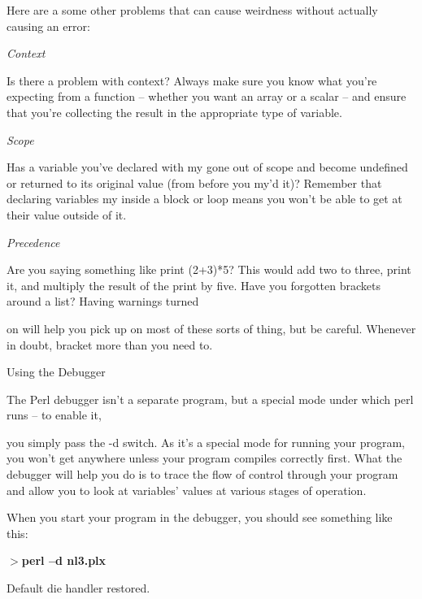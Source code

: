 \documentclass[a4paper,11pt]{book}
\begin{document}
\noindent 

\noindent Here are a some other problems that can cause weirdness without actually causing an error:

\noindent 

\noindent \textit{Context}

\noindent Is there a problem with context? Always make sure you know what you're expecting from a function -- whether you want an array or a scalar -- and ensure that you're collecting the result in the appropriate type of variable.

\noindent 

\noindent \textit{Scope}

\noindent Has a variable you've declared with my gone out of scope and become undefined or returned to its original value (from before you my'd it)? Remember that declaring variables my inside a block or loop means you won't be able to get at their value outside of it.

\noindent 

\noindent \textit{Precedence}

\noindent Are you saying something like print (2+3)*5? This would add two to three, print it, and multiply the result of the print by five. Have you forgotten brackets around a list? Having warnings turned

\noindent on will help you pick up on most of these sorts of thing, but be careful. Whenever in doubt, bracket more than you need to.

\noindent 

\noindent Using the Debugger

\noindent The Perl debugger isn't a separate program, but a special mode under which perl runs -- to enable it,

\noindent you simply pass the -d switch. As it's a special mode for running your program, you won't get anywhere unless your program compiles correctly first. What the debugger will help you do is to trace the flow of control through your program and allow you to look at variables' values at various stages of operation.

\noindent 

\noindent When you start your program in the debugger, you should see something like this:

\noindent 

\noindent $>$\textbf{perl --d nl3.plx}

\noindent Default die handler restored.

\noindent 
\end{document}
